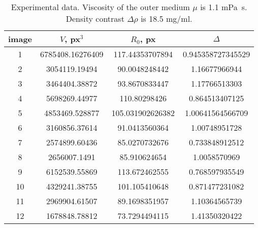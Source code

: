 \begin{table}
\centering
\begin{tabular}{|c|c|c|c|}
\hline
image & $V$, px$^3$ & $R_0$, px & $\Delta$\\ 
\hline
1 & 6785408.16276409 & 117.44353707894 & 0.945358727345529\\ 
\hline
2 & 3054119.19494 & 90.0048248442 & 1.16677966944\\ 
\hline
3 & 3464404.38872 & 93.8670833447 & 1.17766513303\\ 
\hline
4 & 5698269.44977 & 110.80298426 & 0.864513407125\\ 
\hline
5 & 4853469.528877 & 105.031902626382 & 1.00641564566709\\ 
\hline
6 & 3160856.37614 & 91.0413560364 & 1.00748951728\\ 
\hline
7 & 2574899.60436 & 85.0270732676 & 0.733848912512\\ 
\hline
8 & 2656007.1491 & 85.910624654 & 1.0058570969\\ 
\hline
9 & 6152539.55869 & 113.672462555 & 0.768597935549\\ 
\hline
10 & 4329241.38755 & 101.105410648 & 0.871477231082\\ 
\hline
11 & 2969904.61507 & 89.1698351957 & 1.10364565739\\ 
\hline
12 & 1678848.78812 & 73.7294494115 & 1.41350320422\\ 
\hline\end{tabular}
\caption{\small{Experimental data. Viscosity of the outer medium $\mu$ is 1.1 mPa~s. Density contrast $\Delta\rho$ is 18.5 mg/ml.}}
\label{tab:experiment} 
\end{table}